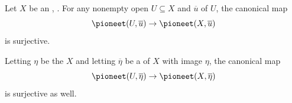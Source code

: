 \begin{proposition} \label{proposition:map_of_etale_fundamental_group_for_open_in_irreducible_geometrically_unibranch_scheme_is_surjective}
    Let $X$ be an , . For any nonempty open $U \subseteq X$ and  $\overline{u}$ of $U$, the canonical map
    $$\pioneet(U, \overline{u}) \to \pioneet(X, \overline{u})$$
    is surjective.

    Letting $\eta$ be the  $X$ and letting $\overline{\eta}$ be a  of $X$ with image $\eta$, the canonical map 
    $$\pioneet(U, \overline{\eta}) \to \pioneet(X, \overline{\eta})$$
    is surjective as well.
\end{proposition}